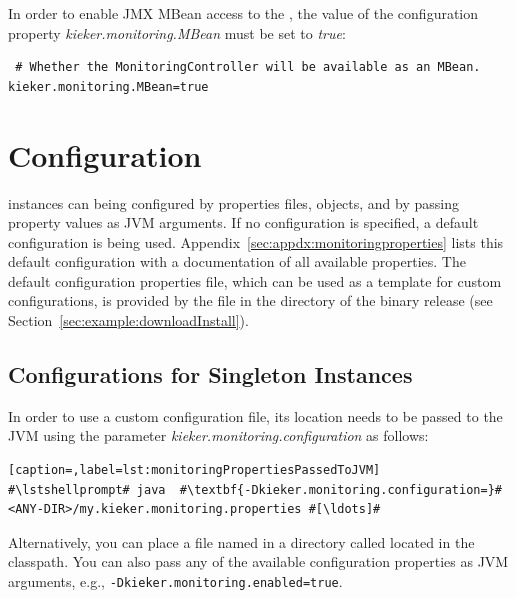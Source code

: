 In order to enable JMX MBean access to the , the value of the %
configuration property \textit{kieker.monitoring.MBean} must be set to \textit{true}:\\

\setPropertiesListing
\begin{lstlisting}
 # Whether the MonitoringController will be available as an MBean.
kieker.monitoring.MBean=true
\end{lstlisting}

\section{\KiekerMonitoringPart{} Configuration}\label{sec:monitoring:configuration}

\KiekerMonitoringPart{} instances can being configured by properties files, %
 objects, and by passing property values as %
JVM arguments. If no configuration is specified, a default %
configuration is being used. %
Appendix~\ref{sec:appdx:monitoringproperties} lists this default %
configuration with a documentation of all available properties. %
The default configuration properties file, which %
can be used as a template for custom configurations, is provided by the file %
\file{\monitoringPropertiesFile} in the directory  of %
the binary release (see Section~\ref{sec:example:downloadInstall}). %


\subsection*{Configurations for Singleton Instances}

In order to use a custom configuration file, its location needs to be passed to %
the JVM using the parameter \textit{kieker.monitoring.configuration} as follows:

\setBashListing
\begin{lstlisting}[caption=,label=lst:monitoringPropertiesPassedToJVM]
#\lstshellprompt# java	#\textbf{-Dkieker.monitoring.configuration=}#<ANY-DIR>/my.kieker.monitoring.properties #[\ldots]#
\end{lstlisting}

\noindent Alternatively, you can place a file named  %
in a directory called  located in the classpath. %
You can also pass any of the available configuration properties as JVM %
arguments, e.g., \lstinline{-Dkieker.monitoring.enabled=true}. %

